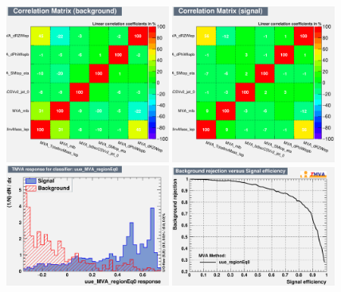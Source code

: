 \begin{figure}[htbp]
	\includegraphics[width=0.48\textwidth]{6_Search/Figures/MVAtechnics/singletopzct/uue/CorrelationMatrixB.png}
	\includegraphics[width=0.48\textwidth]{6_Search/Figures/MVAtechnics/singletopzct/uue/CorrelationMatrixS.png}
	\includegraphics[width=0.48\textwidth]{6_Search/Figures/MVAtechnics/singletopzct/uue/mva_uue_MVA_regionEq0.png}
	\includegraphics[width=0.48\textwidth]{6_Search/Figures/MVAtechnics/singletopzct/uue/rejBvsS.png}

\end{figure}
